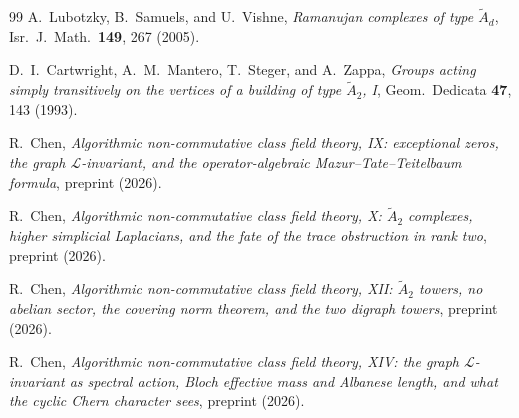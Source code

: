 \documentclass[aps,prb,reprint,amsmath,amssymb,floatfix,superscriptaddress]{revtex4-2}
\theoremstyle{plain}
\theoremstyle{definition}
\theoremstyle{remark}
\begin{document}
\begin{thebibliography}{99}
 A.~Lubotzky, B.~Samuels, and U.~Vishne,
\emph{Ramanujan complexes of type $\widetilde A_d$},
Isr.\ J.\ Math.\ \textbf{149}, 267 (2005).

 D.~I.~Cartwright, A.~M.~Mantero, T.~Steger, and A.~Zappa,
\emph{Groups acting simply transitively on the vertices of a building of type
$\widetilde A_2$, I},
Geom.\ Dedicata \textbf{47}, 143 (1993).

 R.~Chen,
\emph{Algorithmic non-commutative class field theory, IX: exceptional zeros, the graph
$\mathcal L$-invariant, and the operator-algebraic Mazur--Tate--Teitelbaum formula},
preprint (2026).

 R.~Chen,
\emph{Algorithmic non-commutative class field theory, X: $\widetilde A_2$ complexes, higher
simplicial Laplacians, and the fate of the trace obstruction in rank two},
preprint (2026).

 R.~Chen,
\emph{Algorithmic non-commutative class field theory, XII: $\widetilde A_2$ towers, no
abelian sector, the covering norm theorem, and the two digraph towers},
preprint (2026).

 R.~Chen,
\emph{Algorithmic non-commutative class field theory, XIV: the graph $\mathcal L$-invariant
as spectral action, Bloch effective mass and Albanese length, and what the cyclic Chern
character sees},
preprint (2026).

\end{thebibliography}
\end{document}
